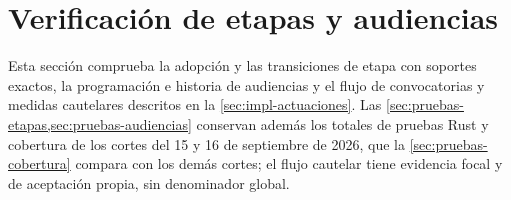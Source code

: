 
\section{Verificación de etapas y audiencias}\label{sec:pruebas-actuaciones}

Esta sección comprueba la adopción y las transiciones de etapa con soportes exactos, la programación e historia de audiencias y el flujo de convocatorias y medidas cautelares descritos en la \cref{sec:impl-actuaciones}. Las \cref{sec:pruebas-etapas,sec:pruebas-audiencias} conservan además los totales de pruebas Rust y cobertura de los cortes del 15 y 16 de septiembre de 2026, que la \cref{sec:pruebas-cobertura} compara con los demás cortes; el flujo cautelar tiene evidencia focal y de aceptación propia, sin denominador global.





